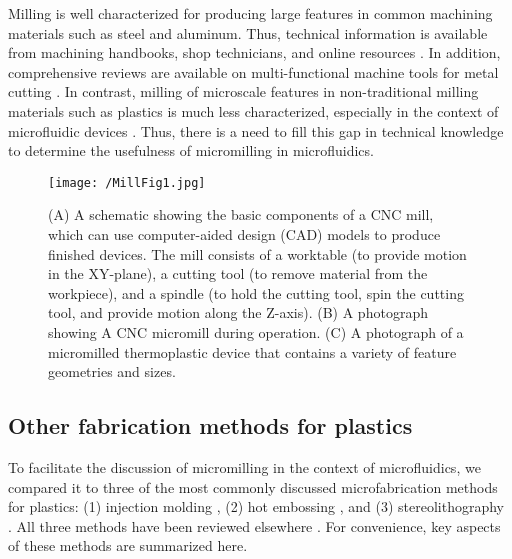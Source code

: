 Milling is well characterized for producing large features in common machining materials such as steel and aluminum. Thus, technical information is available from machining handbooks, shop technicians, and online resources \cite{Chi-Hsiang2013}. In addition, comprehensive reviews are available on multi-functional machine tools for metal cutting \cite{Moriwaki2008}. In contrast, milling of microscale features in non-traditional milling materials such as plastics is much less characterized, especially in the context of microfluidic devices \cite{Chen2014}. Thus, there is a need to fill this gap in technical knowledge to determine the usefulness of micromilling in microfluidics.

\begin{figure}[h!] %
\centering
\texttt{[image: /MillFig1.jpg]}
\caption[\textbf{Milling overview}]{(A) A schematic showing the basic components of a CNC mill, which can use computer-aided design (CAD) models to produce finished devices. The mill consists of a worktable (to provide motion in the XY-plane), a cutting tool (to remove material from the workpiece), and a spindle (to hold the cutting tool, spin the cutting tool, and provide motion along the Z-axis). (B) A photograph showing A CNC micromill during operation. (C) A photograph of a micromilled thermoplastic device that contains a variety of feature geometries and sizes.}
\label{figure:MillFig1}
\end{figure}

\subsection{Other fabrication methods for plastics}
To facilitate the discussion of micromilling in the context of microfluidics, we compared it to three of the most commonly discussed microfabrication methods for plastics: (1) injection molding \cite{Attia2009, Tanzi2013}, (2) hot embossing \cite{Becker2000a, Abgrall2007}, and (3) stereolithography \cite{Waldbaur2011, Au2014}. All three methods have been reviewed elsewhere \cite{Melchels2010}. For convenience, key aspects of these methods are summarized here.

